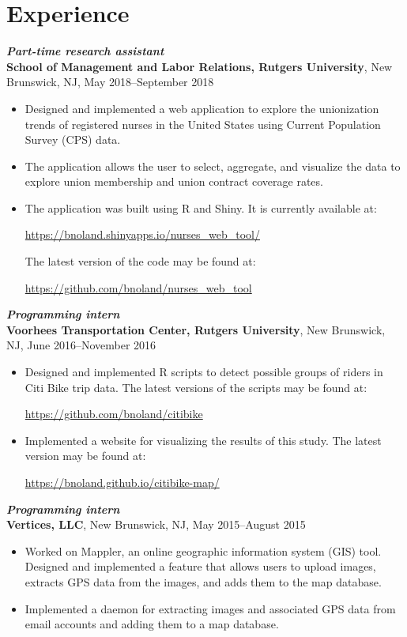 \documentclass[letterpaper,12pt]{article}
\begin{document}
\section*{Experience}
\textit{\textbf{Part-time research assistant}} \\
\textbf{School of Management and Labor Relations, Rutgers University}, New Brunswick, NJ, May 
2018--September 2018
\begin{itemize}
\item
Designed and implemented a web application to explore the unionization trends of registered 
nurses in the United States using Current Population Survey (CPS) data.
\item
The application allows the user to select, aggregate, and visualize the data to explore union 
membership and union contract coverage rates.
\item
The application was built using R and Shiny. It is currently available at:
\begin{center}
\url{https://bnoland.shinyapps.io/nurses_web_tool/}
\end{center}
The latest version of the code may be found at:
\begin{center}
\url{https://github.com/bnoland/nurses_web_tool}
\end{center}
\end{itemize}

\textit{\textbf{Programming intern}} \\
\textbf{Voorhees Transportation Center, Rutgers University}, New Brunswick, NJ, June 2016--November 
2016
\begin{itemize}
\item
Designed and implemented R scripts to detect possible groups of riders in Citi Bike trip data. The 
latest versions of the scripts may be found at:
\begin{center}
\url{https://github.com/bnoland/citibike}
\end{center}

\item
Implemented a website for visualizing the results of this study. The latest version may be found at:
\begin{center}
\url{https://bnoland.github.io/citibike-map/}
\end{center}

\end{itemize}

\textit{\textbf{Programming intern}} \\
\textbf{Vertices, LLC}, New Brunswick, NJ, May 2015--August 2015
\begin{itemize}
\item
Worked on Mappler, an online geographic information system (GIS) tool. Designed and implemented a 
feature that allows users to upload images, extracts GPS data from the images, and adds them to the 
map database.
\item
Implemented a daemon for extracting images and associated GPS data from email accounts and adding 
them to a map database.
\end{itemize}
\end{document}

